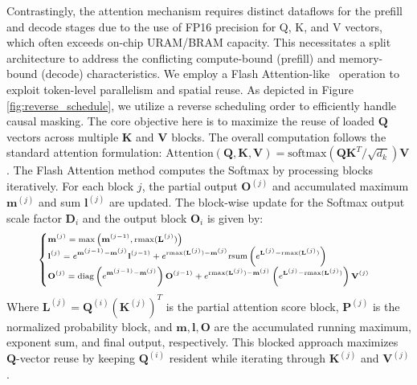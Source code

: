 \documentclass[9pt,sigconf]{acmart}
\begin{document}
Contrastingly, the attention mechanism requires distinct dataflows for the prefill and decode stages due to the use of FP16 precision for Q, K, and V vectors, which often exceeds on-chip URAM/BRAM capacity. This necessitates a split architecture to address the conflicting compute-bound (prefill) and memory-bound (decode) characteristics.
We employ a Flash Attention-like~\cite{dao2022flashattentionfastmemoryefficientexact} operation to exploit token-level parallelism and spatial reuse. As depicted in Figure \ref{fig:reverse_schedule}, we utilize a reverse scheduling order to efficiently handle causal masking. The core objective here is to maximize the reuse of loaded $\mathbf{Q}$ vectors across multiple $\mathbf{K}$ and $\mathbf{V}$ blocks. The overall computation follows the standard attention formulation:
$
\text{Attention}(\mathbf{Q}, \mathbf{K}, \mathbf{V}) = \text{softmax}\left(\mathbf{Q} \mathbf{K}^T/\sqrt{d_k}\right)\mathbf{V}
$.
The Flash Attention method computes the Softmax by processing blocks iteratively. For each block $j$, the partial output $\mathbf{O}^{(j)}$ and accumulated maximum $\mathbf{m}^{(j)}$ and sum $\mathbf{l}^{(j)}$ are updated. The block-wise update for the Softmax output scale factor $\mathbf{D}_i$ and the output block $\mathbf{O}_i$ is given by:
\begin{equation}
\text{\scriptsize $
\begin{cases}
    \mathbf{m}^{(j)} = \max\left(\mathbf{m}^{(j-1)}, \text{rmax}(\mathbf{L}^{(j)})\right) \\
    \mathbf{l}^{(j)} = e^{\mathbf{m}^{(j-1)} - \mathbf{m}^{(j)}} \mathbf{l}^{(j-1)} + e^{\text{rmax}(\mathbf{L}^{(j)}) - \mathbf{m}^{(j)}} \text{rsum}\left(e^{\mathbf{L}^{(j)} - \text{rmax}(\mathbf{L}^{(j)})}\right) \\
    \mathbf{O}^{(j)} = \text{diag}\left( e^{\mathbf{m}^{(j-1)} - \mathbf{m}^{(j)}} \right) \mathbf{O}^{(j-1)} + e^{\text{rmax}(\mathbf{L}^{(j)}) - \mathbf{m}^{(j)}} \left(e^{\mathbf{L}^{(j)} - \text{rmax}(\mathbf{L}^{(j)})}\right) \mathbf{V}^{(j)}
\end{cases}
$}
\end{equation}
Where $\mathbf{L}^{(j)} = \mathbf{Q}^{(i)} (\mathbf{K}^{(j)})^T$ is the partial attention score block, $\mathbf{P}^{(j)}$ is the normalized probability block, and $\mathbf{m}, \mathbf{l}, \mathbf{O}$ are the accumulated running maximum, exponent sum, and final output, respectively. This blocked approach maximizes $\mathbf{Q}$-vector reuse by keeping $\mathbf{Q}^{(i)}$ resident while iterating through $\mathbf{K}^{(j)}$ and $\mathbf{V}^{(j)}$.
\end{document}
